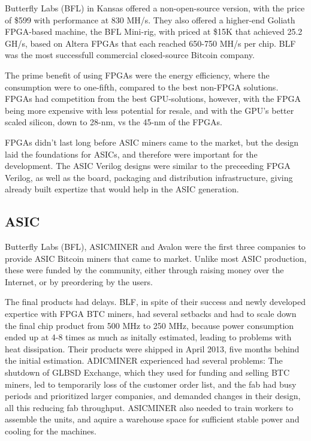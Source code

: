 Butterfly Labs (BFL) in Kansas offered a non-open-source version, with the price of \$599 with performance at 830 MH/s.
They also offered a higher-end Goliath FPGA-based machine, the BFL Mini-rig, with priced at \$15K that achieved 25.2 GH/s, based on Altera FPGAs that each reached 650-750 MH/s per chip.
BLF was the most successfull commercial closed-source Bitcoin company.

The prime benefit of using FPGAs were the energy efficiency, where the consumption were to one-fifth, compared to the best non-FPGA solutions.
FPGAs had competition from the best GPU-solutions, however, with the FPGA being more expensive with less potential for resale, and with the GPU's better scaled silicon, down to 28-nm, vs the 45-nm of the FPGAs.

FPGAs didn't last long before ASIC miners came to the market, but the design laid the foundations for ASICs, and therefore were important for the development. 
The ASIC Verilog designs were similar to the preceeding FPGA Verilog, as well as the board, packaging and distribution infrastructure, giving already built expertize that would help in the ASIC generation.
\cite{bespoke-silicon}

\subsection{ASIC}

Butterfly Labs (BFL), ASICMINER and Avalon were the first three companies to provide ASIC Bitcoin miners that came to market.
Unlike most ASIC production, these were funded by the community, either through raising money over the Internet, or by preordering by the users.

The final products had delays. 
BLF, in spite of their success and newly developed expertice with FPGA BTC miners, had several setbacks and had to scale down the final chip product from 500 MHz to 250 MHz, because power consumption ended up at 4-8 times as much as initally estimated, leading to problems with heat dissipation.
Their products were shipped in April 2013, five months behind the initial estimation.
ADICMINER experienced had several problems: The shutdown of GLBSD Exchange, which they used for funding and selling BTC miners, led to temporarily loss of the customer order list, and the fab had busy periods and prioritized larger companies, and demanded changes in their design, all this reducing fab throughput. 
ASICMINER also needed to train workers to assemble the units, and aquire a warehouse space for sufficient stable power and cooling for the machines.   

